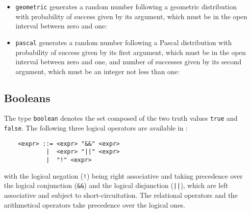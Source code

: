 \begin{itemize}
\item {\tt geometric} generates a random number following a geometric distribution with probability of
success given by its argument, which must be in the open interval between zero and one:

\item {\tt pascal} generates a random number following a Pascal distribution with probability of success
given by its first argument, which must be in the open interval between zero and one, and number of
successes given by its second argument, which must be an integer not less than one:

	\end{itemize}


\subsection{Booleans}

The type {\tt boolean} denotes the set composed of the two truth values {\tt true} and {\tt false}. The
following three logical operators are available in \aemilia:

	\begin{verbatim}
    <expr> ::= <expr> "&&" <expr>
            |  <expr> "||" <expr>
            |  "!" <expr>
	\end{verbatim}

\noindent with the logical negation ({\tt !}) being right associative and taking precedence over the logical
conjunction ({\tt \&\&}) and the logical disjunction ({\tt ||}), which are left associative and subject to
short-circuitation. The relational operators and the arithmetical operators take precedence over the logical
ones.


